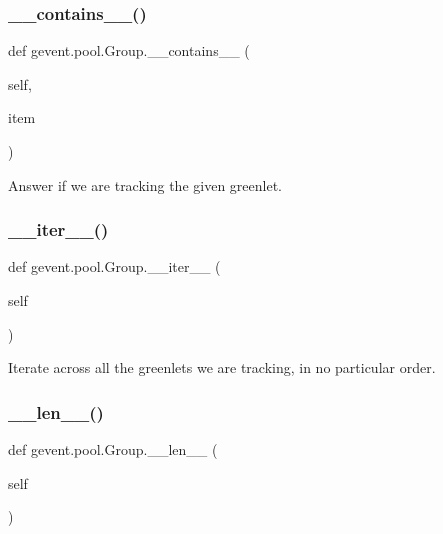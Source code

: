 \subsubsection{\texorpdfstring{\+\_\+\+\_\+contains\+\_\+\+\_\+()}{\_\_contains\_\_()}}
{\footnotesize\ttfamily def gevent.\+pool.\+Group.\+\_\+\+\_\+contains\+\_\+\+\_\+ (\begin{DoxyParamCaption}\item[{}]{self,  }\item[{}]{item }\end{DoxyParamCaption})}

\begin{DoxyVerb}Answer if we are tracking the given greenlet.
\end{DoxyVerb}
 \mbox{\label{classgevent_1_1pool_1_1_group_a813354827619c66daf0d1ab2acef81e3}} 
\subsubsection{\texorpdfstring{\+\_\+\+\_\+iter\+\_\+\+\_\+()}{\_\_iter\_\_()}}
{\footnotesize\ttfamily def gevent.\+pool.\+Group.\+\_\+\+\_\+iter\+\_\+\+\_\+ (\begin{DoxyParamCaption}\item[{}]{self }\end{DoxyParamCaption})}

\begin{DoxyVerb}Iterate across all the greenlets we are tracking, in no particular order.
\end{DoxyVerb}
 \mbox{\label{classgevent_1_1pool_1_1_group_afae785c70abd12596435a98fa2440d55}} 
\subsubsection{\texorpdfstring{\+\_\+\+\_\+len\+\_\+\+\_\+()}{\_\_len\_\_()}}
{\footnotesize\ttfamily def gevent.\+pool.\+Group.\+\_\+\+\_\+len\+\_\+\+\_\+ (\begin{DoxyParamCaption}\item[{}]{self }\end{DoxyParamCaption})}

